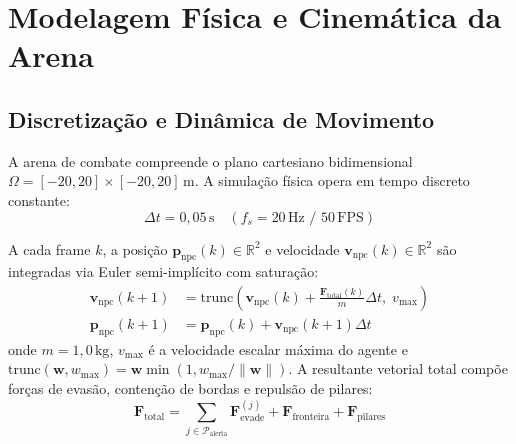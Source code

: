 \documentclass[10pt,conference,twocolumn]{article}
\begin{document}
\section{Modelagem Física e Cinemática da Arena}
\label{sec:cinematica}

\subsection{Discretização e Dinâmica de Movimento}
A arena de combate compreende o plano cartesiano bidimensional $\Omega = [-20, 20] \times [-20, 20]\,\text{m}$. A simulação física opera em tempo discreto constante:
\begin{equation}
\Delta t = 0{,}05\,\text{s} \quad (f_s = 20\,\text{Hz} \text{ / } 50\,\text{FPS})
\end{equation}

A cada frame $k$, a posição $\mathbf{p}_{\text{npc}}(k) \in \mathbb{R}^2$ e velocidade $\mathbf{v}_{\text{npc}}(k) \in \mathbb{R}^2$ são integradas via Euler semi-implícito com saturação:
\begin{align}
\mathbf{v}_{\text{npc}}(k+1) &= \text{trunc}\left(\mathbf{v}_{\text{npc}}(k) + \frac{\mathbf{F}_{\text{total}}(k)}{m}\Delta t, \; v_{\text{max}}\right) \label{eq:euler_vel} \\
\mathbf{p}_{\text{npc}}(k+1) &= \mathbf{p}_{\text{npc}}(k) + \mathbf{v}_{\text{npc}}(k+1)\Delta t \label{eq:euler_pos}
\end{align}
onde $m = 1{,}0\,\text{kg}$, $v_{\text{max}}$ é a velocidade escalar máxima do agente e $\text{trunc}(\mathbf{w}, w_{\text{max}}) = \mathbf{w} \min(1, w_{\text{max}}/\|\mathbf{w}\|)$. A resultante vetorial total compõe forças de evasão, contenção de bordas e repulsão de pilares:
\begin{equation}
\mathbf{F}_{\text{total}} = \sum_{j \in \mathcal{P}_{\text{alerta}}} \mathbf{F}_{\text{evade}}^{(j)} + \mathbf{F}_{\text{fronteira}} + \mathbf{F}_{\text{pilares}}
\end{equation}
\end{document}
